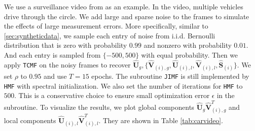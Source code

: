 \documentclass[twoside,11pt]{article}
\def\name{\texttt{TCMF}\xspace}
\def\inneralg{\texttt{JIMF}\xspace}
\def\hmf{\texttt{HMF}\xspace}
\newcommand{\hmatS}{\hat{\mathbf{S}}}
\newcommand{\hmatU}{\hat{\mathbf{U}}}
\newcommand{\hmatV}{\hat{\mathbf{V}}}
\begin{document}
We use a surveillance video from \cite{vacavant} as an example. In the video, multiple vehicles drive through the circle. We add large and sparse noise to the frames to simulate the effects of large measurement errors. More specifically, similar to \ref{sec:syntheticdata}, we sample each entry of noise from i.i.d. Bernoulli distribution that is zero with probability $0.99$ and nonzero with probability $0.01$. And each entry is sampled from $\{-500,500\}$ with equal probability. Then we apply \name on the noisy frames to recover $\hmatU_g,\{\hmatV_{(i),g},\hmatU_{(i),l},\hmatV_{(i),l},\hmatS_{(i)}\}$. We set $\rho$ to $0.95$ and use $T=15$ epochs. The subroutine \inneralg is still implemented by \hmf with spectral initialization. We also set the number of iterations for \hmf to $500$. This is a conservative choice to ensure small optimization error $\epsilon$ in the subroutine. To visualize the results, we plot global components $\hmatU_g\hmatV_{(i),g}^T$ and local components $\hmatU_{(i),l}\hmatV_{(i),l}^T$. They are shown in Table \ref{tab:carvideo}.
\end{document}
